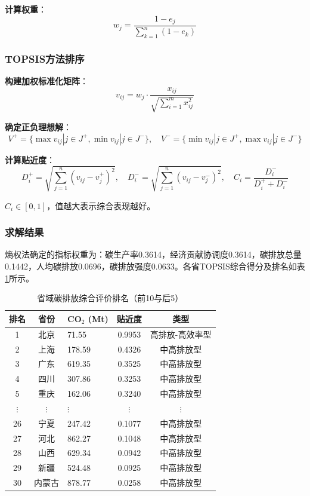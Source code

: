 \documentclass[12pt, a4paper]{article}
\begin{document}
\textbf{计算权重}：
\begin{equation}
w_j = \frac{1 - e_j}{\sum_{k=1}^{n} (1 - e_k)}
\label{eq:weight}
\end{equation}

\subsubsection{TOPSIS方法排序}

\textbf{构建加权标准化矩阵}：
\begin{equation}
v_{ij} = w_j \cdot \frac{x_{ij}}{\sqrt{\sum_{i=1}^{m} x_{ij}^2}}
\label{eq:topsis_norm}
\end{equation}

\textbf{确定正负理想解}：
\begin{equation}
V^+ = \{\max v_{ij} | j \in J^+, \min v_{ij} | j \in J^-\}, \quad
V^- = \{\min v_{ij} | j \in J^+, \max v_{ij} | j \in J^-\}
\label{eq:ideal}
\end{equation}

\textbf{计算贴近度}：
\begin{equation}
D_i^+ = \sqrt{\sum_{j=1}^{n} (v_{ij} - v_j^+)^2}, \quad
D_i^- = \sqrt{\sum_{j=1}^{n} (v_{ij} - v_j^-)^2}, \quad
C_i = \frac{D_i^-}{D_i^+ + D_i^-}
\label{eq:closeness}
\end{equation}

$C_i \in [0,1]$，值越大表示综合表现越好。

\subsubsection{求解结果}

熵权法确定的指标权重为：碳生产率0.3614，经济贡献协调度0.3614，碳排放总量0.1442，人均碳排放0.0696，碳排放强度0.0633。各省TOPSIS综合得分及排名如表\ref{tab:ranking}所示。

\begin{table}[H]
\centering
\caption{省域碳排放综合评价排名（前10与后5）}
\label{tab:ranking}
\begin{tabular}{cclcc}
\toprule
\textbf{排名} & \textbf{省份} & \textbf{CO$_2$ (Mt)} & \textbf{贴近度} & \textbf{类型} \\
\midrule
1  & 北京 &   71.55 & 0.9953 & 高排放-高效率型 \\
2  & 上海 &  178.59 & 0.4326 & 中高排放型 \\
3  & 广东 &  619.35 & 0.3525 & 中高排放型 \\
4  & 四川 &  307.86 & 0.3253 & 中高排放型 \\
5  & 重庆 &  162.06 & 0.3240 & 中高排放型 \\
$\vdots$ & $\vdots$ & $\vdots$ & $\vdots$ & $\vdots$ \\
26 & 宁夏 &  247.42 & 0.1077 & 中高排放型 \\
27 & 河北 &  862.27 & 0.1048 & 中高排放型 \\
28 & 山西 &  629.34 & 0.0942 & 中高排放型 \\
29 & 新疆 &  524.48 & 0.0925 & 中高排放型 \\
30 & 内蒙古 & 878.77 & 0.0258 & 中高排放型 \\
\bottomrule
\end{tabular}
\end{table}
\end{document}
